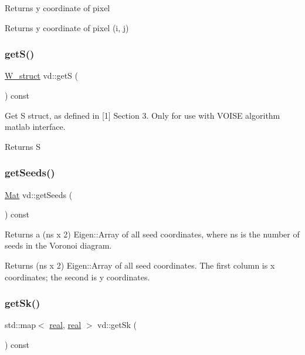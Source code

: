 Returns y coordinate of pixel \begin{DoxyReturn}{Returns}
y coordinate of pixel (i, j) 
\end{DoxyReturn}
\mbox{\label{classvd_a7f901e0c6d226b81f262c2363a69844a}} 
\subsubsection{\texorpdfstring{get\+S()}{getS()}}
{\footnotesize\ttfamily \mbox{\hyperlink{structW__struct}{W\+\_\+struct}} vd\+::getS (\begin{DoxyParamCaption}{ }\end{DoxyParamCaption}) const}

Get S struct, as defined in \mbox{[}1\mbox{]} Section 3. Only for use with V\+O\+I\+SE algorithm matlab interface. \begin{DoxyReturn}{Returns}
S 
\end{DoxyReturn}
\mbox{\label{classvd_a82f353c594c3c6b24f6077398f059d3a}} 
\subsubsection{\texorpdfstring{get\+Seeds()}{getSeeds()}}
{\footnotesize\ttfamily \mbox{\hyperlink{typedefs_8cpp_a9fa28c1f74e909474857584f5c7b0088}{Mat}} vd\+::get\+Seeds (\begin{DoxyParamCaption}{ }\end{DoxyParamCaption}) const}

Returns a (ns x 2) Eigen\+::\+Array of all seed coordinates, where ns is the number of seeds in the Voronoi diagram. \begin{DoxyReturn}{Returns}
(ns x 2) Eigen\+::\+Array of all seed coordinates. The first column is x coordinates; the second is y coordinates. 
\end{DoxyReturn}
\mbox{\label{classvd_a5c6dc6e749c955b5ee26139e19a02e0b}} 
\subsubsection{\texorpdfstring{get\+Sk()}{getSk()}}
{\footnotesize\ttfamily std\+::map$<$ \mbox{\hyperlink{typedefs_8cpp_a58a0c7cf2501f4492da833421be92547}{real}}, \mbox{\hyperlink{typedefs_8cpp_a58a0c7cf2501f4492da833421be92547}{real}} $>$ vd\+::get\+Sk (\begin{DoxyParamCaption}{ }\end{DoxyParamCaption}) const}

